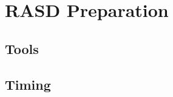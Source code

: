 \documentclass[11pt,a4paper]{report}
\begin{document}
\chapter{RASD Preparation}
\section{Tools}
\section{Timing}



\end{document}
